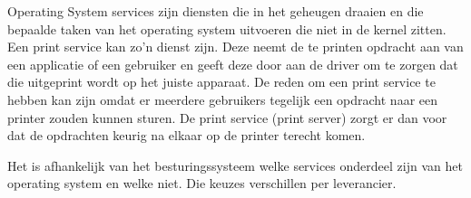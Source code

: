 Operating System services zijn diensten die in het geheugen draaien en die bepaalde taken van het operating system uitvoeren die niet in de kernel zitten. Een print service kan zo'n dienst zijn. Deze neemt de te printen opdracht aan van een applicatie of een gebruiker en geeft deze door aan de driver om te zorgen dat die uitgeprint wordt op het juiste apparaat. De reden om een print service te hebben kan zijn omdat er meerdere gebruikers tegelijk een opdracht naar een printer zouden kunnen sturen. De print service (print server) zorgt er dan voor dat de opdrachten keurig na elkaar op de printer terecht komen.

Het is afhankelijk van het besturingssysteem welke services onderdeel zijn van het operating system en welke niet. Die keuzes verschillen per leverancier.

